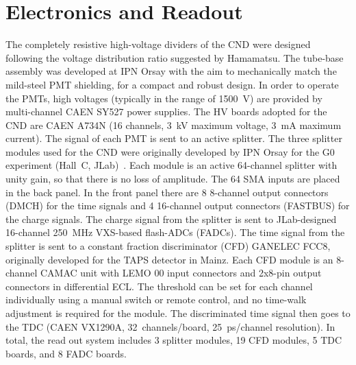 \section{Electronics and Readout}

The completely resistive high-voltage dividers of the CND were designed following the voltage distribution ratio suggested by Hamamatsu. The tube-base assembly was developed at IPN Orsay with the aim to mechanically match the mild-steel PMT shielding, for a compact and robust design. 
In order to operate the PMTs, high voltages (typically in the range of 1500~V) are provided by multi-channel CAEN SY527 power supplies. 
The HV boards adopted for the CND are CAEN A734N (16 channels, 3~kV maximum voltage, 3~mA maximum current). %
The signal of each PMT is sent to an active splitter.
The three splitter modules used for the CND were originally developed by IPN Orsay for the G0 experiment (Hall~C,
JLab)~\cite{Androic:2011rha}. Each module is an active 64-channel splitter with unity gain, so that there is no loss of amplitude. The 64 SMA inputs are placed in the back panel. In the front panel there are 8 8-channel output connectors (DMCH) for the time signals and 4 16-channel output connectors (FASTBUS) for the charge signals. 
The charge signal from the splitter is sent to JLab-designed 16-channel 250~MHz VXS-based flash-ADCs (FADCs).  
The time signal from the splitter is sent to a constant fraction discriminator (CFD) GANELEC FCC8, originally developed for the TAPS detector in Mainz. Each CFD module is an 8-channel CAMAC unit with LEMO 00 input connectors and 2x8-pin output connectors in differential ECL. The threshold can be set for each channel individually using a manual switch or remote control, and no time-walk adjustment is required for the module.  
The discriminated time signal then goes to the TDC (CAEN VX1290A, 32~channels/board, 25~ps/channel resolution). 
In total, the read out system includes 3 splitter modules, 19 CFD modules, 5 TDC boards, and 8 FADC boards. 



